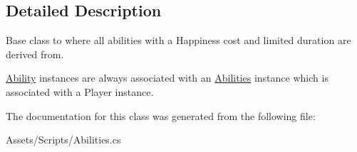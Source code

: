 \subsection{Detailed Description}
Base class to where all abilities with a Happiness cost and limited duration are derived from. 

\hyperlink{class_ability}{Ability} instances are always associated with an \hyperlink{class_abilities}{Abilities} instance which is associated with a Player instance. 

The documentation for this class was generated from the following file\+:\begin{DoxyCompactItemize}
\item 
Assets/\+Scripts/Abilities.\+cs\end{DoxyCompactItemize}
